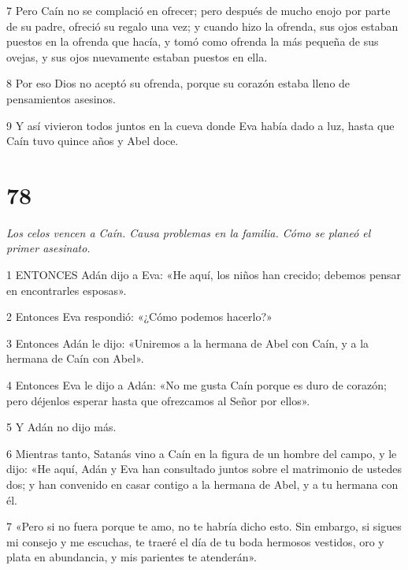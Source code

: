 \par 7 Pero Caín no se complació en ofrecer; pero después de mucho enojo por parte de su padre, ofreció su regalo una vez; y cuando hizo la ofrenda, sus ojos estaban puestos en la ofrenda que hacía, y tomó como ofrenda la más pequeña de sus ovejas, y sus ojos nuevamente estaban puestos en ella.

\par 8 Por eso Dios no aceptó su ofrenda, porque su corazón estaba lleno de pensamientos asesinos.

\par 9 Y así vivieron todos juntos en la cueva donde Eva había dado a luz, hasta que Caín tuvo quince años y Abel doce.

\chapter{78}

\par \textit{Los celos vencen a Caín. Causa problemas en la familia. Cómo se planeó el primer asesinato.}

\par 1 ENTONCES Adán dijo a Eva: «He aquí, los niños han crecido; debemos pensar en encontrarles esposas».

\par 2 Entonces Eva respondió: «¿Cómo podemos hacerlo?»

\par 3 Entonces Adán le dijo: «Uniremos a la hermana de Abel con Caín, y a la hermana de Caín con Abel».

\par 4 Entonces Eva le dijo a Adán: «No me gusta Caín porque es duro de corazón; pero déjenlos esperar hasta que ofrezcamos al Señor por ellos».

\par 5 Y Adán no dijo más.

\par 6 Mientras tanto, Satanás vino a Caín en la figura de un hombre del campo, y le dijo: «He aquí, Adán y Eva han consultado juntos sobre el matrimonio de ustedes dos; y han convenido en casar contigo a la hermana de Abel, y a tu hermana con él.

\par 7 «Pero si no fuera porque te amo, no te habría dicho esto. Sin embargo, si sigues mi consejo y me escuchas, te traeré el día de tu boda hermosos vestidos, oro y plata en abundancia, y mis parientes te atenderán».

